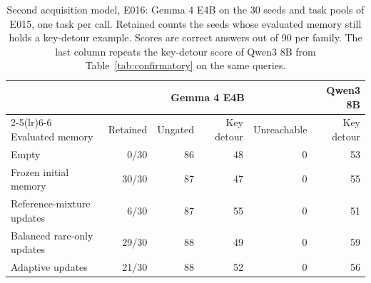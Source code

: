 \begin{table}[t]
\centering
\caption{Second acquisition model, E016: Gemma 4 E4B on the 30 seeds
and task pools of E015, one task per call. Retained counts the seeds
whose evaluated memory still holds a key-detour example. Scores are
correct answers out of 90 per family. The last column repeats the
key-detour score of Qwen3 8B from Table~\ref{tab:confirmatory} on the
same queries.}
\label{tab:second-model}
\setlength{\tabcolsep}{4.5pt}
\begin{tabular}{lrrrrr}
\toprule
 & \multicolumn{4}{c}{Gemma 4 E4B} & Qwen3 8B \\
\cmidrule(lr){2-5}\cmidrule(lr){6-6}
Evaluated memory & Retained & Ungated & Key detour & Unreachable & Key detour \\
\midrule
Empty & 0/30 & 86 & 48 & 0 & 53 \\
Frozen initial memory & 30/30 & 87 & 47 & 0 & 55 \\
Reference-mixture updates & 6/30 & 87 & 55 & 0 & 51 \\
Balanced rare-only updates & 29/30 & 88 & 49 & 0 & 59 \\
Adaptive updates & 21/30 & 88 & 52 & 0 & 56 \\
\bottomrule
\end{tabular}
\end{table}
